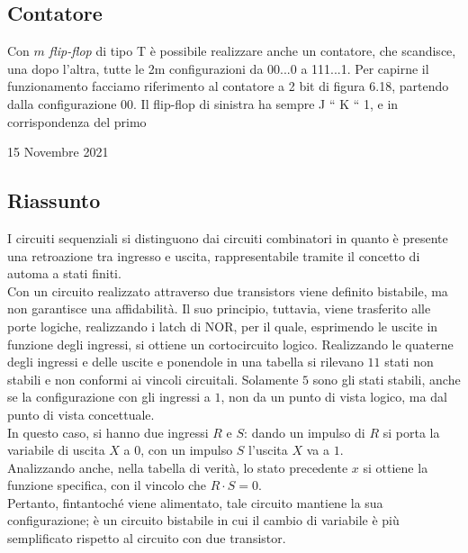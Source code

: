 \documentclass[a4paper]{extarticle}
\begin{document}
\subsection{Contatore}
Con \(m\) \textit{flip-flop} di tipo T è possibile realizzare anche un contatore, che scandisce, una dopo l’altra, tutte le 2m
configurazioni da 00...0 a 111...1. Per capirne il funzionamento facciamo riferimento al contatore a 2 bit di figura
6.18, partendo dalla configurazione 00. Il flip-flop di sinistra ha sempre J “ K “ 1, e in corrispondenza del primo


\newpage
\begin{center}
    15 Novembre 2021
\end{center}
\subsection{Riassunto}
I circuiti sequenziali si distinguono dai circuiti combinatori in quanto è presente una retroazione tra ingresso e uscita, rappresentabile tramite il concetto di automa a stati finiti.\\
Con un circuito realizzato attraverso due transistors viene definito bistabile, ma non garantisce una affidabilità. Il suo principio, tuttavia, viene trasferito alle porte logiche, realizzando i latch di NOR, per il quale, esprimendo le uscite in funzione degli ingressi, si ottiene un cortocircuito logico. Realizzando le quaterne degli ingressi e delle uscite e ponendole in una tabella si rilevano \(11\) stati non stabili e non conformi ai vincoli circuitali. Solamente \(5\) sono gli stati stabili, anche se la configurazione con gli ingressi a \(1\), non da un punto di vista logico, ma dal punto di vista concettuale.\\
In questo caso, si hanno due ingressi \(R\) e \(S\): dando un impulso di \(R\) si porta la variabile di uscita \(X\) a \(0\), con un impulso \(S\) l'uscita \(X\) va a \(1\).\\
Analizzando anche, nella tabella di verità, lo stato precedente \(x\) si ottiene la funzione specifica,
con il vincolo che \(R \cdot S = 0\).\\
Pertanto, fintantoché viene alimentato, tale circuito mantiene la sua configurazione; è un circuito bistabile in cui il cambio di variabile è più semplificato rispetto al circuito con due transistor.
\end{document}

